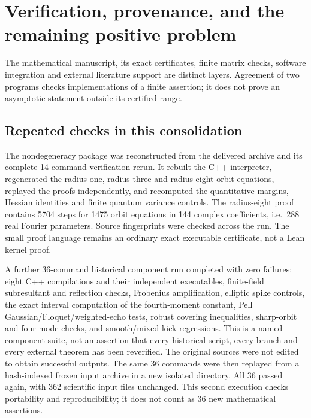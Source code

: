 \section{Verification, provenance, and the remaining positive problem}
\label{sec:verification}
The mathematical manuscript, its exact certificates, finite matrix checks,
software integration and external literature support are distinct layers.
Agreement of two programs checks implementations of a finite assertion; it
does not prove an asymptotic statement outside its certified range.

\subsection{Repeated checks in this consolidation}
The nondegeneracy package was reconstructed from the delivered archive and
its complete 14-command verification rerun. It rebuilt the C++ interpreter,
regenerated the radius-one, radius-three and radius-eight orbit equations,
replayed the proofs independently, and recomputed the quantitative margins,
Hessian identities and finite quantum variance controls. The radius-eight
proof contains 5704 steps for 1475 orbit equations in 144 complex coefficients,
i.e.\ 288 real Fourier parameters. Source fingerprints were checked across
the run. The small proof language remains an ordinary exact executable
certificate, not a Lean kernel proof.

A further 36-command historical component run completed with zero failures:
eight C++ compilations and their independent executables, finite-field
subresultant and reflection checks, Frobenius amplification, elliptic
spike controls, the exact interval computation of the fourth-moment constant,
Pell Gaussian/Floquet/weighted-echo tests, robust covering inequalities,
sharp-orbit and four-mode checks, and smooth/mixed-kick regressions.
This is a named component suite, not an assertion that every historical
script, every branch and every external theorem has been reverified.
The original sources were not edited to obtain successful outputs. The same
36 commands were then replayed from a hash-indexed frozen input archive in
a new isolated directory. All 36 passed again, with 362 scientific input
files unchanged. This second execution checks portability and reproducibility;
it does not count as 36 new mathematical assertions.

